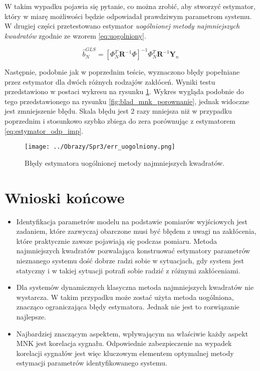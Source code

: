 \documentclass[12pt,a4paper]{article}
\begin{document}
W takim wypadku pojawia się pytanie, co można zrobić, aby stworzyć estymator, który w miarę możliwości będzie odpowiadał prawdziwym parametrom systemu.
W drugiej części przetestowano estymator \textit{uogólnionej metody najmniejszych kwadratów} zgodnie ze wzorem \ref{eq:uogolniony}.

\begin{equation}\label{eq:uogolniony}
\hat{b}_{N}^{GLS} = [\Phi_{N}^{T}\boldsymbol{R}^{-1}\Phi]^{-1}\Phi_{N}^{T}\boldsymbol{R}^{-1}\boldsymbol{Y}_{n}
\end{equation}

Następnie, podobnie jak w poprzednim teście, wyznaczono błędy popełniane przez estymator dla dwóch różnych rodzajów zakłóceń.
Wyniki testu przedstawiono w postaci wykresu na rysunku \ref{fig:err_uogolniony}.
Wykres wygląda podobnie do tego przedstawionego na rysunku \ref{fig:blad_mnk_porownanie}, jednak widoczne jest zmniejszenie błędu. Skala błędu jest 2 razy mniejsza niż w przypadku poprzednim i stosunkowo szybko zbiega do zera porównując z estymatorem \ref{eq:estymator_odp_imp}.


\begin{figure}[H]
\centering
\texttt{[image: ../Obrazy/Spr3/err\_uogolniony.png]} 
\caption{Błędy estymatora uogólnionej metody najmniejszych kwadratów.}
\label{fig:err_uogolniony}
\end{figure}


\newpage
\section{Wnioski końcowe}
\begin{itemize}
\item Identyfikacja parametrów modelu na podstawie pomiarów wyjściowych jest zadaniem, które zazwyczaj obarczone musi być błędem z uwagi na zakłócenia, które praktycznie zawsze pojawiają się podczas pomiaru.
Metoda najmniejszych kwadratów pozwalająca konstruować estymatory parametrów nieznanego systemu dość dobrze radzi sobie w sytuacjach, gdy system jest statyczny i w takiej sytuacji potrafi sobie radzić z różnymi zakłóceniami.
\item Dla systemów dynamicznych klasyczna metoda najmniejszych kwadratów nie wystarcza. W takim przypadku może zostać użyta metoda uogólniona, znacząco ograniczająca błędy estymatora. Jednak nie jest to rozwiązanie najlepsze.
\item Najbardziej znaczącym aspektem, wpływającym na właściwie każdy aspekt MNK jest korelacja sygnału. Odpowiednie zabezpieczenie na wypadek korelacji sygnałów jest więc kluczowym elementem optymalnej metody estymacji parametrów identyfikowanego systemu.
\end{itemize}



\nocite{rachunek2006jakubowski}
\nocite{wstep2001jakubowski}
 

\end{document}
